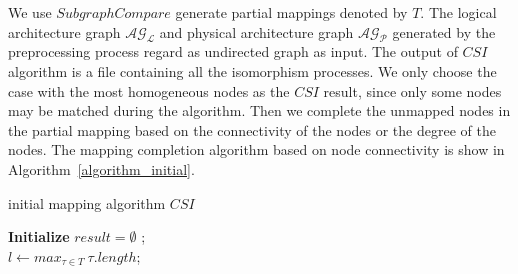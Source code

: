 \documentclass[runningheads]{llncs}
\begin{document}
We use $SubgraphCompare$ generate partial mappings denoted by $T$. The logical architecture graph  $\mathcal{AG_{L}}$ 
and physical architecture graph $\mathcal{AG_{P}}$ generated by the preprocessing process regard as undirected graph as input. The output of $CSI$ algorithm is a file containing all the isomorphism processes. We only choose the case with the most homogeneous nodes as the $CSI$ result, since only some nodes may be matched during the algorithm. Then we complete the unmapped nodes in the partial mapping based on the connectivity of the nodes or the degree of the nodes. The mapping completion algorithm based on node connectivity is show in Algorithm~\ref{algorithm_initial}.
\begin{algorithm}  
	\label{algorithm_initial}
	\caption{initial mapping algorithm $CSI$}  
	\LinesNumbered  
	\textbf{Initialize} $result=\emptyset$ ;\\
	$l \leftarrow max_{\tau \in T} \  \tau.length$; \\
	\end{algorithm}
	
\end{document}
